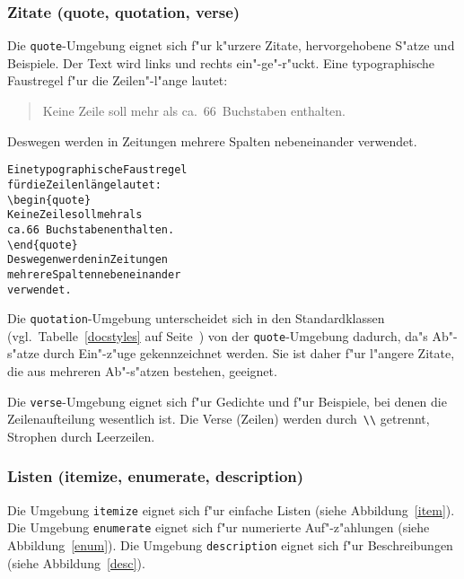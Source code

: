\subsubsection{Zitate (quote, quotation, verse)}
 
Die \texttt{quote}-Umgebung eignet sich f"ur k"urzere Zitate,
hervorgehobene S"atze und Beispiele.
Der Text wird links und rechts ein"-ge"-r"uckt.
\exa
Eine typographische Faustregel
f"ur die Zeilen"-l"ange lautet:
\begin{quote}
\relax %
Keine Zeile soll mehr als
ca.\ 66~Buchstaben enthalten.
\end{quote}
Deswegen werden in Zeitungen
mehrere Spalten nebeneinander
verwendet.
\exb 
\begin{alltt}
Eine typographische Faustregel
f\"ur die Zeilenl\"ange lautet:
\verb+\begin{quote}+
Keine Zeile soll mehr als
ca.\bs{} 66~Buchstaben enthalten.
\verb+\end{quote}+
Deswegen werden in Zeitungen
mehrere Spalten nebeneinander
verwendet.
\end{alltt}
\exc

Die \texttt{quotation}-Umgebung unterscheidet sich in den
Standardklassen (vgl.\ Tabelle~\ref{docstyles} auf
Seite~\pageref{docstyles}) von der \texttt{quote}-Umgebung
dadurch, da"s Ab"-s"atze durch Ein"-z"uge gekennzeichnet werden.
Sie ist daher f"ur l"angere Zitate, die aus mehreren Ab"-s"atzen
bestehen, geeignet.

Die \texttt{verse}-Umgebung eignet sich f"ur Gedichte und f"ur
Beispiele, bei denen die Zeilenaufteilung wesentlich ist.  Die
Verse (Zeilen) werden durch~\verb|\\| getrennt, Strophen durch
Leerzeilen.


\subsubsection{Listen (itemize, enumerate, description)}
 
Die Umgebung \texttt{itemize} eignet sich f"ur einfache Listen
(siehe Abbildung~\ref{item}).
Die Umgebung \texttt{enumerate} eignet sich f"ur numerierte
Auf"-z"ahlungen (siehe Abbildung~\ref{enum}).
Die Umgebung \texttt{description} eignet sich f"ur Beschreibungen
(siehe Abbildung~\ref{desc}).

